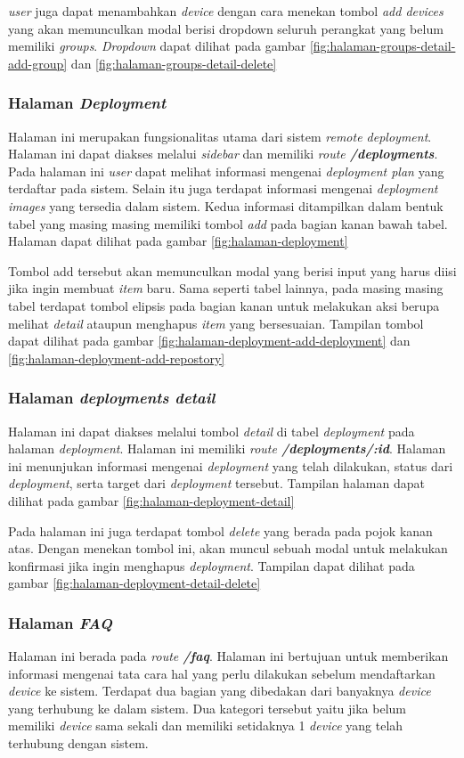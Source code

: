 \textit{user} juga dapat menambahkan \textit{device} dengan cara menekan tombol \textit{add devices} yang akan memunculkan modal berisi dropdown seluruh perangkat yang belum memiliki \textit{groups}. \textit{Dropdown} dapat dilihat pada gambar \ref{fig:halaman-groups-detail-add-group} dan \ref{fig:halaman-groups-detail-delete}

\subsubsection{Halaman \textit{Deployment}}
Halaman ini merupakan fungsionalitas utama dari sistem \textit{remote deployment}. Halaman ini dapat diakses melalui \textit{sidebar} dan memiliki \textit{route \textbf{/deployments}}. Pada halaman ini \textit{user} dapat melihat informasi mengenai \textit{deployment plan} yang terdaftar pada sistem. Selain itu juga terdapat informasi mengenai \textit{deployment images} yang tersedia dalam sistem. Kedua informasi ditampilkan dalam bentuk tabel yang masing masing memiliki tombol \textit{add} pada bagian kanan bawah tabel. Halaman dapat dilihat pada gambar \ref{fig:halaman-deployment}

Tombol add tersebut akan memunculkan modal yang berisi input yang harus diisi jika ingin membuat \textit{item} baru. Sama seperti tabel lainnya, pada masing masing tabel terdapat tombol elipsis pada bagian kanan untuk melakukan aksi berupa melihat \textit{detail} ataupun menghapus \textit{item} yang bersesuaian. Tampilan tombol dapat dilihat pada gambar \ref{fig:halaman-deployment-add-deployment} dan \ref{fig:halaman-deployment-add-repostory}

\subsubsection{Halaman \textit{deployments detail}}
Halaman ini dapat diakses melalui tombol \textit{detail} di tabel \textit{deployment} pada halaman \textit{deployment}. Halaman ini memiliki \textit{route \textbf{/deployments/:id}}. Halaman ini menunjukan informasi mengenai \textit{deployment} yang telah dilakukan, status dari \textit{deployment}, serta target dari \textit{deployment} tersebut. Tampilan halaman dapat dilihat pada gambar \ref{fig:halaman-deployment-detail}

Pada halaman ini juga terdapat tombol \textit{delete} yang berada pada pojok kanan atas. Dengan menekan tombol ini, akan muncul sebuah modal untuk melakukan konfirmasi jika ingin menghapus \textit{deployment}. Tampilan dapat dilihat pada gambar \ref{fig:halaman-deployment-detail-delete}

\subsubsection{Halaman \textit{FAQ}}
Halaman ini berada pada \textit{route \textbf{/faq}}. Halaman ini bertujuan untuk memberikan informasi mengenai tata cara hal yang perlu dilakukan sebelum mendaftarkan \textit{device} ke sistem. Terdapat dua bagian yang dibedakan dari banyaknya \textit{device} yang terhubung ke dalam sistem. Dua kategori tersebut yaitu jika belum memiliki \textit{device} sama sekali dan memiliki setidaknya 1 \textit{device} yang telah terhubung dengan sistem.
